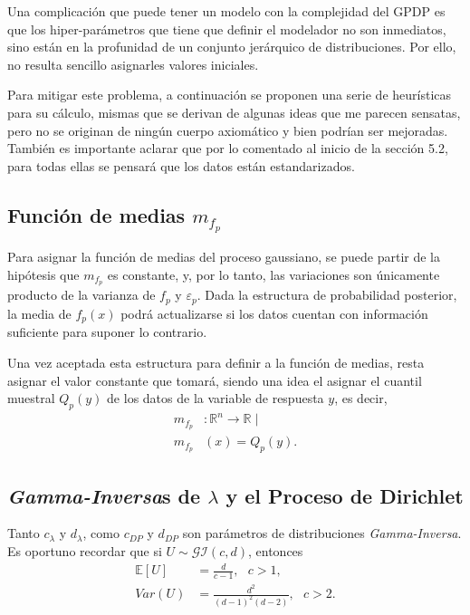 Una complicaci\'on que puede tener un modelo con la complejidad del GPDP es que los hiper-par\'ametros que tiene que definir el modelador no son inmediatos, sino est\'an en la profunidad de un conjunto jer\'arquico de distribuciones. Por ello, no resulta sencillo asignarles valores iniciales.

Para mitigar este problema, a continuaci\'on se proponen una serie de heur\'isticas para su c\'alculo, mismas que se derivan de algunas ideas que me parecen sensatas, pero no se originan de ning\'un cuerpo axiom\'atico y bien podr\'ian ser mejoradas. Tambi\'en es importante aclarar que por lo comentado al inicio de la secci\'on 5.2, para todas ellas se pensar\'a que los datos est\'an estandarizados.

\subsection{Funci\'on de medias $m_{f_p}$}

Para asignar la funci\'on de medias del proceso gaussiano, se puede partir de la hip\'otesis que $m_{f_p}$ es constante, y, por lo tanto, las variaciones son \'unicamente producto de la varianza de $f_p$ y $\varepsilon_p$. Dada la estructura de probabilidad posterior, la media de $f_p(x)$ podr\'a actualizarse si los datos cuentan con informaci\'on suficiente para suponer lo contrario. 

Una vez aceptada esta estructura para definir a la funci\'on de medias, resta asignar el valor constante que tomar\'a, siendo una idea el asignar el cuantil muestral $Q_p(y)$ de los datos de la variable de respuesta $y$, es decir,
\begin{equation*}
\begin{aligned}
    m_{f_p}&:\mathbb{R}^n \rightarrow \mathbb{R} \mid \\
    m_{f_p}&(x) = Q_p(y).
\end{aligned}
\end{equation*}

\subsection{\textit{Gamma-Inversa}s de $\lambda$ y el Proceso de Dirichlet}

Tanto $c_\lambda$ y $d_\lambda$, como $c_{DP}$ y $d_{DP}$ son par\'ametros de distribuciones \textit{Gamma-Inversa}. Es oportuno recordar que si $U \sim \mathcal{GI}(c,d)$, entonces
\begin{equation*}
\begin{aligned}
    \mathbb{E}[U] &= \frac{d}{c-1}, \text{ } c>1,\\
    Var(U) &= \frac{d^2}{(d-1)^2(d-2)}, \text{ } c>2.
\end{aligned}
\end{equation*}

